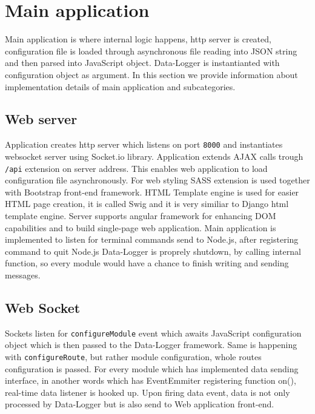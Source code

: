 \section{Main application} %
\label{sec:main_application}
Main application is where internal logic happens, http server is created, configuration file is loaded through asynchronous file reading into JSON string and then parsed into JavaScript object. Data-Logger is instantianted with configuration object as argument. In this section we provide information about implementation details of main application and subcategories.
\subsection{Web server} %
\label{sub:web_server}
Application creates http server which listens on port \verb|8000| and instantiates websocket server using Socket.io library. Application extends AJAX calls trough \verb|/api| extension on server address.
This enables web application to load configuration file asynchronously. For web styling SASS extension is used together with Bootstrap front-end framework. HTML Template engine is used for easier HTML page creation, it is called Swig and it is very similiar to Django html template engine. Server supports angular framework for enhancing DOM capabilities and to build single-page web application. Main application is implemented to listen for terminal commands send to Node.js, after registering command to quit Node.js Data-Logger is proprely shutdown, by calling internal function, so every module would have a chance to finish writing and sending messages.%
\subsection{Web Socket} %
\label{sub:web_socket}
Sockets listen for \verb|configureModule| event which awaits JavaScript configuration object which is then passed to the Data-Logger framework. Same is happening with \verb|configureRoute|, but rather module configuration, whole routes configuration is passed. For every module which has implemented data sending interface, in another words which has EventEmmiter registering function on(), real-time data listener is hooked up. Upon firing data event, data is not only processed by Data-Logger but is also send to Web application front-end.

